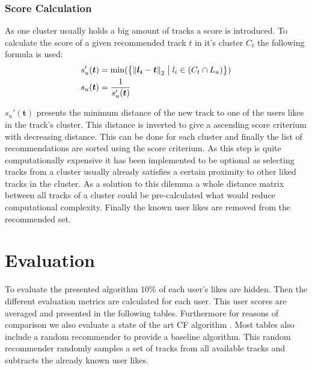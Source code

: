 \documentclass[cic,tc,english]{iiufrgs}
\newcommand{\norm}[1]{\left\lVert #1 \right\rVert_{2}}
\begin{document}
\subsection{Score Calculation}
As one cluster usually holds a big amount of tracks a score is introduced. To calculate the score of a given recommended track $t$ in it's cluster $C_t$ the following formula is used:
\begin{equation}
\begin{split}
s_{u}'(\bm{t}) &=   \min(\bigl\{ \norm{\bm{l_{i}} - \bm{t}} \bigm| l_i \in (C_t \cap L_u) \bigr\}) \\
s_{u}(\bm{t}) &= \frac{1} {s_{u}'(\bm{t})} 
\end{split}
\end{equation}


$s_{u}'(\bm{t})$ presents the minimum distance of the new track to one of the users likes in the track's cluster. This distance is inverted to give a ascending score criterium with decreasing distance. This can be done for each cluster and finally the list of recommendations are sorted using the score criterium. As this step is quite computationally expensive it has been implemented to be optional as selecting tracks from a cluster usually already satisfies a certain proximity to other liked tracks in the cluster. As a solution to this dilemma a whole distance matrix between all tracks of a cluster could be pre-calculated what would reduce computational complexity. Finally the known user likes are removed from the recommended set.


\chapter{Evaluation}
To evaluate the presented algorithm $10\%$ of each user's likes are hidden. Then the different evaluation metrics are calculated for each user. This user scores are averaged and presented in the following tables. Furthermore for reasons of comparison we also evaluate a state of the art CF algorithm \cite{low2014graphlab}. Most tables also include a random recommender to provide a baseline algorithm. This random recommender randomly samples a set of tracks from all available tracks and subtracts the already known user likes.


\end{document}
